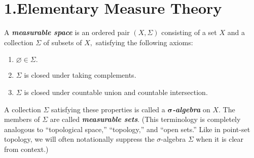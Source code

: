 \documentclass{article}
\begin{document}
\newcommand{\R}{\mathbb{R}}
\renewcommand{\C}{\mathbb{C}}
\newcommand{\Rext}{{\R \cup \{\infty\}}}
\newcommand{\RExt}{{\R \cup \{-\infty, \infty\}}}
\mdxtitleblockstart{}
\mdxauthorstart{}
\mdxauthorend\mdtitleauthorrunning{}{}\mdxtitleblockend%

\section{1.\hspace*{0.5em}Elementary Measure Theory}\label{sec-elementary-measure-theory}%

\noindent{}A \textbf{\emph{measurable space}} is an ordered pair $(X, \Sigma)$ consisting of a set $X$ and a collection $\Sigma$ of subsets of $X,$ satisfying the following axioms:%

\begin{enumerate}[noitemsep,topsep=\mdcompacttopsep]%

\item{}$\varnothing \in \Sigma.$%

\item{}$\Sigma$ is closed under taking complements.%

\item{}$\Sigma$ is closed under countable union and countable intersection.%
\end{enumerate}%

\noindent{}A collection $\Sigma$ satisfying these properties is called a \textbf{\emph{$\bm{\sigma}$-algebra}} on $X.$ The members of $\Sigma$ are called \textbf{\emph{measurable sets}}. (This terminology is completely analogous to \textquotedblleft{}topological space,\textquotedblright{} \textquotedblleft{}topology,\textquotedblright{} and \textquotedblleft{}open sets.\textquotedblright{} Like in point-set topology, we will often notationally suppress the $\sigma$-algebra $\Sigma$ when it is clear from context.)%
\end{document}
